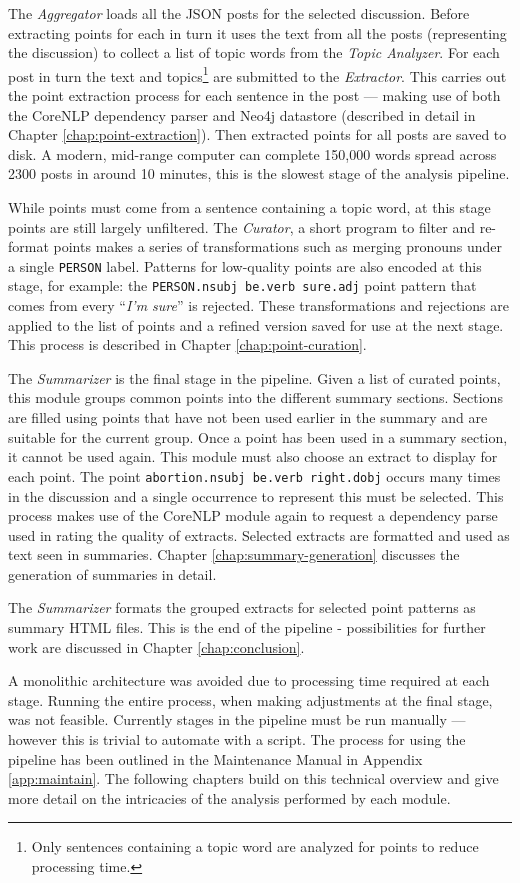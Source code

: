   The \textit{Aggregator} loads all the JSON posts for the selected discussion. Before extracting points for each in turn it uses the text from all the posts (representing the discussion) to collect a list of topic words from the \textit{Topic Analyzer}. For each post in turn the text and topics\footnote{Only sentences containing a topic word are analyzed for points to reduce processing time.} are submitted to the \textit{Extractor}. This carries out the point extraction process for each sentence in the post --- making use of both the CoreNLP dependency parser and Neo4j datastore (described in detail in Chapter \ref{chap:point-extraction}). Then extracted points for all posts are saved to disk. A modern, mid-range computer can complete 150,000 words spread across 2300 posts in around 10 minutes, this is the slowest stage of the analysis pipeline.

  While points must come from a sentence containing a topic word, at this stage points are still largely unfiltered. The \textit{Curator}, a short program to filter and re-format points makes a series of transformations such as merging pronouns under a single \texttt{PERSON} label. Patterns for low-quality points are also encoded at this stage, for example: the \texttt{PERSON.nsubj be.verb sure.adj} point pattern that comes from every ``\textit{I'm sure}'' is rejected. These transformations and rejections are applied to the list of points and a refined version saved for use at the next stage. This process is described in Chapter \ref{chap:point-curation}.

  The \textit{Summarizer} is the final stage in the pipeline. Given a list of curated points, this module groups common points into the different summary sections. Sections are filled using points that have not been used earlier in the summary and are suitable for the current group. Once a point has been used in a summary section, it cannot be used again. This module must also choose an extract to display for each point. The point \texttt{abortion.nsubj be.verb right.dobj} occurs many times in the discussion and a single occurrence to represent this must be selected. This process makes use of the CoreNLP module again to request a dependency parse used in rating the quality of extracts. Selected extracts are formatted and used as text seen in summaries. Chapter \ref{chap:summary-generation} discusses the generation of summaries in detail.

  The \textit{Summarizer} formats the grouped extracts for selected point patterns as summary HTML files. This is the end of the pipeline - possibilities for further work are discussed in Chapter \ref{chap:conclusion}.

  A monolithic architecture was avoided due to processing time required at each stage. Running the entire process, when making adjustments at the final stage, was not feasible. Currently stages in the pipeline must be run manually --- however this is trivial to automate with a script. The process for using the pipeline has been outlined in the Maintenance Manual in Appendix \ref{app:maintain}. The following chapters build on this technical overview and give more detail on the intricacies of the analysis performed by each module.
